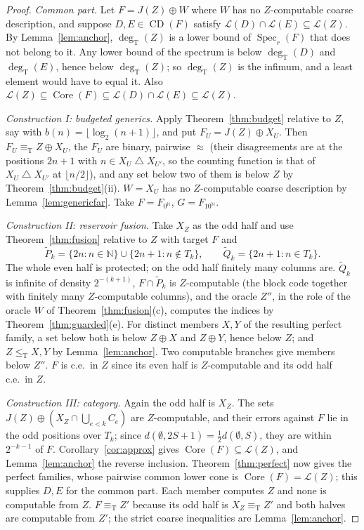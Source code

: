 \documentclass[11pt,letterpaper]{article}
\theoremstyle{definition}
\numberwithin{equation}{section}
\newcommand{\N}{\mathbb N}
\newcommand{\leT}{\le_{\mathrm T}}
\newcommand{\eqT}{\equiv_{\mathrm T}}
\newcommand{\CD}{\operatorname{CD}}
\newcommand{\Low}{\mathcal L}
\newcommand{\Core}{\operatorname{Core}}
\newcommand{\Spec}{\operatorname{Spec}}
\newcommand{\degT}{\deg_{\mathrm T}}
\newcommand{\J}{J}
\newcommand{\sd}{\mathbin{\triangle}}
\begin{document}
\begin{proof}
\emph{Common part.} Let $F=\J(Z)\oplus W$ where $W$ has no $Z$-computable coarse description, and suppose $D,E\in\CD(F)$ satisfy $\Low(D)\cap\Low(E)\subseteq\Low(Z)$. By Lemma~\ref{lem:anchor}, $\degT(Z)$ is a lower bound of $\Spec_r(F)$ that does not belong to it. Any lower bound of the spectrum is below $\degT(D)$ and $\degT(E)$, hence below $\degT(Z)$; so $\degT(Z)$ is the infimum, and a least element would have to equal it. Also $\Low(Z)\subseteq\Core(F)\subseteq\Low(D)\cap\Low(E)\subseteq\Low(Z)$.

\emph{Construction I: budgeted generics.} Apply Theorem~\ref{thm:budget} relative to $Z$, say with $b(n)=\lfloor\log_2(n+1)\rfloor$, and put $F_U=\J(Z)\oplus X_U$. Then $F_U\eqT Z\oplus X_U$, the $F_U$ are binary, pairwise $\approx$ (their disagreements are at the positions $2n+1$ with $n\in X_U\sd X_{U'}$, so the counting function is that of $X_U\sd X_{U'}$ at $\lfloor n/2\rfloor$), and any set below two of them is below $Z$ by Theorem~\ref{thm:budget}(ii). $W=X_U$ has no $Z$-computable coarse description by Lemma~\ref{lem:genericfar}. Take $F=F_{0^\N}$, $G=F_{10^\N}$.

\emph{Construction II: reservoir fusion.} Take $X_Z$ as the odd half and use Theorem~\ref{thm:fusion} relative to $Z$ with target $F$ and
\[
 \widetilde P_k=\{2n:n\in\N\}\cup\{2n+1:n\notin T_k\},\qquad\widetilde Q_k=\{2n+1:n\in T_k\}.
\]
The whole even half is protected; on the odd half finitely many columns are. $\widetilde Q_k$ is infinite of density $2^{-(k+1)}$, $F\cap\widetilde P_k$ is $Z$-computable (the block code together with finitely many $Z$-computable columns), and the oracle $Z''$, in the role of the oracle $W$ of Theorem~\ref{thm:fusion}(c), computes the indices by Theorem~\ref{thm:guarded}(e). For distinct members $X,Y$ of the resulting perfect family, a set below both is below $Z\oplus X$ and $Z\oplus Y$, hence below $Z$; and $Z\leT X,Y$ by Lemma~\ref{lem:anchor}. Two computable branches give members below $Z''$. $F$ is c.e.\ in $Z$ since its even half is $Z$-computable and its odd half c.e.\ in $Z$.

\emph{Construction III: category.} Again the odd half is $X_Z$. The sets $\J(Z)\oplus(X_Z\cap\bigcup_{e<k}C_e)$ are $Z$-computable, and their errors against $F$ lie in the odd positions over $T_k$; since $d(\emptyset,2S+1)=\tfrac12d(\emptyset,S)$, they are within $2^{-k-1}$ of $F$. Corollary~\ref{cor:approx} gives $\Core(F)\subseteq\Low(Z)$, and Lemma~\ref{lem:anchor} the reverse inclusion. Theorem~\ref{thm:perfect} now gives the perfect families, whose pairwise common lower cone is $\Core(F)=\Low(Z)$; this supplies $D,E$ for the common part. Each member computes $Z$ and none is computable from $Z$. $F\eqT Z'$ because its odd half is $X_Z\eqT Z'$ and both halves are computable from $Z'$; the strict coarse inequalities are Lemma~\ref{lem:anchor}.
\end{proof}
\end{document}
